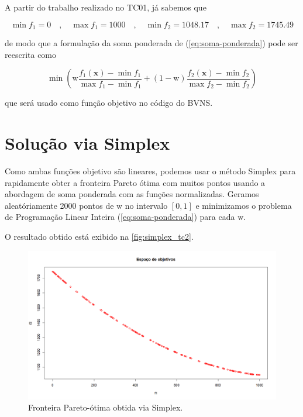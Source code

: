 \documentclass[
	12pt,				%
	oneside,			%
	a4paper,			%
	chapter=TITLE,
	sumario=tradicional,
	english,			%
	brazil				%
]{abntex2}
\begin{document}
A partir do trabalho realizado no TC01, já sabemos que 

\[ 
\min f_1 = 0 \quad , \quad 
\max f_1 = 1000 \quad , \quad 
\min f_2 = 1048.17 \quad , \quad 
\max f_2 = 1745.49 
\]

\noindent de modo que a formulação da soma ponderada de (\ref{eq:soma-ponderada})
pode ser reescrita como  

\[ \min \left( \mathrm{w}\frac{f_1(\mathbf{x}) - \min f_1}{\max f_1 - \min f_1} 
+ (1-\mathrm{w})\frac{f_2(\mathbf{x}) - \min f_2}{\max f_2 - \min f_2}\right)    \]   


\noindent que será usado como função objetivo no código do BVNS.

\chapter{Solução via Simplex}\label{cap:simplex} 

Como ambas funções objetivo são lineares, podemos usar o método Simplex 
para rapidamente obter a fronteira Pareto ótima com muitos pontos usando 
a abordagem de soma ponderada com as funções normalizadas. 
Geramos aleatóriamente 2000 pontos de $\mathrm{w}$ no intervalo $[0, 1]$ e 
minimizamos o problema de Programação Linear Inteira (\ref{eq:soma-ponderada})
para cada $\mathrm{w}$.

O resultado obtido está exibido na \autoref{fig:simplex_tc2}.

\begin{figure}[h!]
	\caption{\label{fig:simplex_tc2}Fronteira Pareto-ótima obtida via Simplex.}
	\begin{center}
    \includegraphics[width=\textwidth,trim=1 1 1 1,clip]{simplex_tc2.png}
	\end{center}
\end{figure}
\end{document}
